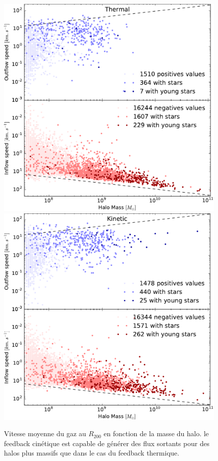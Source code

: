 \begin{figure}
	\centering
	\includegraphics[width=.95\linewidth]{img/03/flux_speed_therm.pdf} 
	\includegraphics[width=.95\linewidth]{img/03/flux_speed_kinetic.pdf} 
    \caption[Vitesse du gaz au $R_{200}$ 2]{Vitesse moyenne du gaz au $R_{200}$ en fonction de la masse du halo. le feedback cinétique est capable de générer des flux sortants pour des halos plus massifs que dans le cas du feedback thermique.}
 	\label{fig:R200speed2}
\end{figure}

